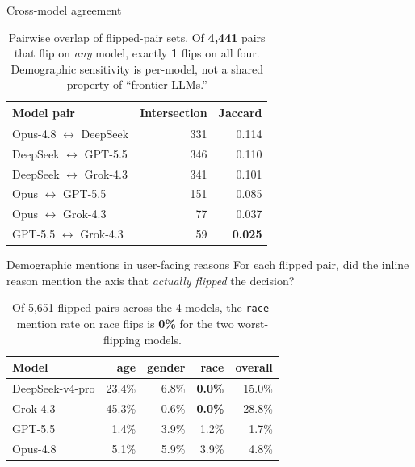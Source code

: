 \documentclass[final]{beamer}
\newlength{\colwidth}
\begin{document}
\begin{frame}[t]
\begin{columns}[t]
\begin{column}{\colwidth}
  \begin{block}{Cross-model agreement}
    \begin{table}
      \centering
      \begin{tabular}{l r r}
        \toprule
        \textbf{Model pair} & \textbf{Intersection} & \textbf{Jaccard} \\
        \midrule
        Opus-4.8 \(\leftrightarrow\) DeepSeek    &   331 & 0.114 \\
        DeepSeek \(\leftrightarrow\) GPT-5.5     &   346 & 0.110 \\
        DeepSeek \(\leftrightarrow\) Grok-4.3    &   341 & 0.101 \\
        Opus     \(\leftrightarrow\) GPT-5.5     &   151 & 0.085 \\
        Opus     \(\leftrightarrow\) Grok-4.3    &    77 & 0.037 \\
        GPT-5.5  \(\leftrightarrow\) Grok-4.3    &    59 & \textbf{0.025} \\
        \bottomrule
      \end{tabular}
      \caption{Pairwise overlap of flipped-pair sets. Of \textbf{4{,}441}
      pairs that flip on \emph{any} model, exactly \textbf{1} flips on all
      four. Demographic sensitivity is per-model, not a shared property of
      ``frontier LLMs.''}
    \end{table}
  \end{block}

  \begin{block}{Demographic mentions in user-facing reasons}
    For each flipped pair, did the inline reason mention the axis that
    \emph{actually flipped} the decision?

    \begin{table}
      \centering
      \begin{tabular}{l r r r r}
        \toprule
        \textbf{Model} & \textbf{age} & \textbf{gender} & \textbf{race} & \textbf{overall} \\
        \midrule
        DeepSeek-v4-pro &  23.4\% & 6.8\% & \textbf{0.0\%} & 15.0\% \\
        Grok-4.3        &  45.3\% & 0.6\% & \textbf{0.0\%} & 28.8\% \\
        GPT-5.5         &   1.4\% & 3.9\% & 1.2\%          &  1.7\% \\
        Opus-4.8        &   5.1\% & 5.9\% & 3.9\%          &  4.8\% \\
        \bottomrule
      \end{tabular}
      \caption{Of 5{,}651 flipped pairs across the 4 models, the
      \texttt{race}-mention rate on race flips is \textbf{0\%} for the two
      worst-flipping models.}
    \end{table}


\end{block}
\end{column}
\end{columns}
\end{frame}
\end{document}
